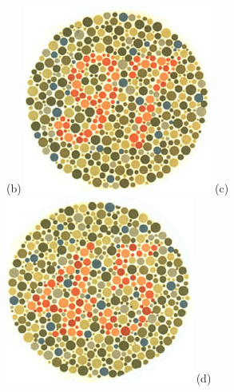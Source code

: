 \documentclass[	12pt, Times, openright, twoside, a4paper, english, brazil]{abntex2}
\begin{document}
\begin{apendicesenv}
\begin{figure}[!htb]
(b)
\endminipage\hfill
{}
\centering
{\includegraphics[width=\linewidth]{ishihara-fuga/plate12.png}}
(c)
\endminipage\hfill
{}
\centering
{\includegraphics[width=\linewidth]{ishihara-fuga/plate13.png}}
(d)
\endminipage\hfill


\end{figure}
\end{apendicesenv}
\end{document}
